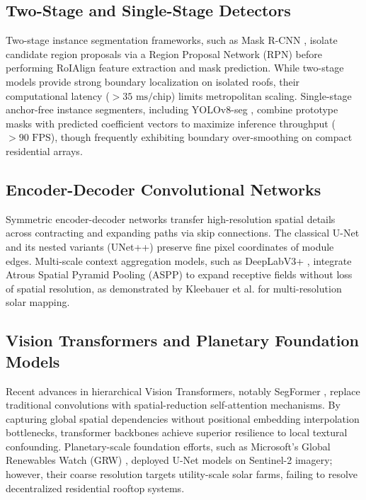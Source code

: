 \documentclass[conference]{IEEEtran}
\begin{document}
\subsection{Two-Stage and Single-Stage Detectors}
Two-stage instance segmentation frameworks, such as Mask R-CNN \cite{b_maskrcnn}, isolate candidate region proposals via a Region Proposal Network (RPN) before performing RoIAlign feature extraction and mask prediction. While two-stage models provide strong boundary localization on isolated roofs, their computational latency ($>35\text{ ms/chip}$) limits metropolitan scaling. Single-stage anchor-free instance segmenters, including YOLOv8-seg \cite{b_yolo}, combine prototype masks with predicted coefficient vectors to maximize inference throughput ($>90\text{ FPS}$), though frequently exhibiting boundary over-smoothing on compact residential arrays.

\subsection{Encoder-Decoder Convolutional Networks}
Symmetric encoder-decoder networks transfer high-resolution spatial details across contracting and expanding paths via skip connections. The classical U-Net \cite{b_unet} and its nested variants (UNet++) \cite{b_moreno} preserve fine pixel coordinates of module edges. Multi-scale context aggregation models, such as DeepLabV3+ \cite{b_deeplab}, integrate Atrous Spatial Pyramid Pooling (ASPP) to expand receptive fields without loss of spatial resolution, as demonstrated by Kleebauer et al. \cite{b_kleebauer} for multi-resolution solar mapping.

\subsection{Vision Transformers and Planetary Foundation Models}
Recent advances in hierarchical Vision Transformers, notably SegFormer \cite{b_segformer}, replace traditional convolutions with spatial-reduction self-attention mechanisms. By capturing global spatial dependencies without positional embedding interpolation bottlenecks, transformer backbones achieve superior resilience to local textural confounding. Planetary-scale foundation efforts, such as Microsoft's Global Renewables Watch (GRW) \cite{b_grw}, deployed U-Net models on Sentinel-2 imagery; however, their coarse resolution targets utility-scale solar farms, failing to resolve decentralized residential rooftop systems.
\end{document}
